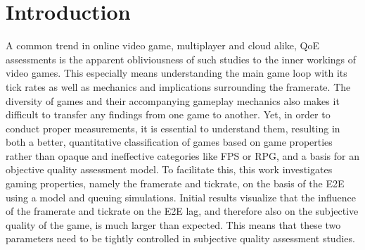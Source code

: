\section{Introduction}
\label{sec:introduction}

A common trend in online video game, multiplayer and cloud alike, \gls{QoE} assessments is the apparent obliviousness of such studies to the inner workings of video games. This especially means understanding the main game loop with its tick rates as well as mechanics and implications surrounding the framerate. The diversity of games and their accompanying gameplay mechanics also makes it difficult to transfer any findings from one game to another. Yet, in order to conduct proper measurements, it is essential to understand them, resulting in both a better, quantitative classification of games based on game properties rather than opaque and ineffective categories like \gls{FPS} or \gls{RPG}, and a basis for an objective quality assessment model. To facilitate this, this work investigates gaming properties, namely the framerate and tickrate, on the basis of the \gls{E2E} using a model and queuing simulations. Initial results visualize that the influence of the framerate and tickrate on the \gls{E2E} lag, and therefore also on the subjective quality of the game, is much larger than expected. This means that these two parameters need to be tightly controlled in subjective quality assessment studies.



